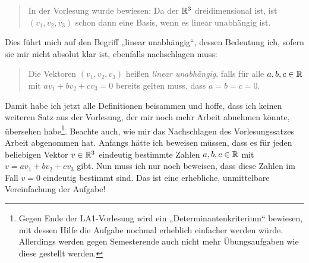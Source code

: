 \begin{de}
  \begin{quote}
   In der Vorlesung wurde bewiesen: Da der ${\mathbb R}^3$ dreidimensional ist, ist $(v_1,v_2,v_3)$ schon dann eine Basis, wenn es linear unabhängig ist.
  \end{quote}
  Dies führt mich auf den Begriff „linear unabhängig“, dessen Bedeutung ich, sofern sie mir nicht absolut klar ist, ebenfalls nachschlagen muss:
  \begin{quote}
   Die Vektoren $(v_1,v_2,v_3)$ heißen \emph{linear unabhängig}, falls für alle $a,b,c\in {\mathbb R}$ mit $av_1+bv_2+cv_3=0$ bereits gelten muss, dass $a=b=c=0$.
  \end{quote}
  Damit habe ich jetzt alle Definitionen beisammen und hoffe, dass ich keinen weiteren Satz aus der Vorlesung, der mir noch mehr Arbeit abnehmen könnte, übersehen habe\footnote{Gegen Ende der LA1-Vorlesung wird ein „Determinantenkriterium“ bewiesen, mit dessen Hilfe die Aufgabe nochmal erheblich einfacher werden würde. Allerdings werden gegen Semesterende auch nicht mehr Übungsaufgaben wie diese gestellt werden.}. Beachte auch, wie mir das Nachschlagen des Vorlesungssatzes Arbeit abgenommen hat. Anfangs hätte ich beweisen müssen, dass es für jeden beliebigen Vektor $v\in {\mathbb R}^3$ eindeutig bestimmte Zahlen $a,b,c\in {\mathbb R}$ mit $v=av_1+bv_2+cv_3$ gibt. Nun muss ich nur noch beweisen, dass diese Zahlen im Fall $v=0$ eindeutig bestimmt sind. Das ist eine erhebliche, unmittelbare Vereinfachung der Aufgabe!
 \end{de}

 
 
